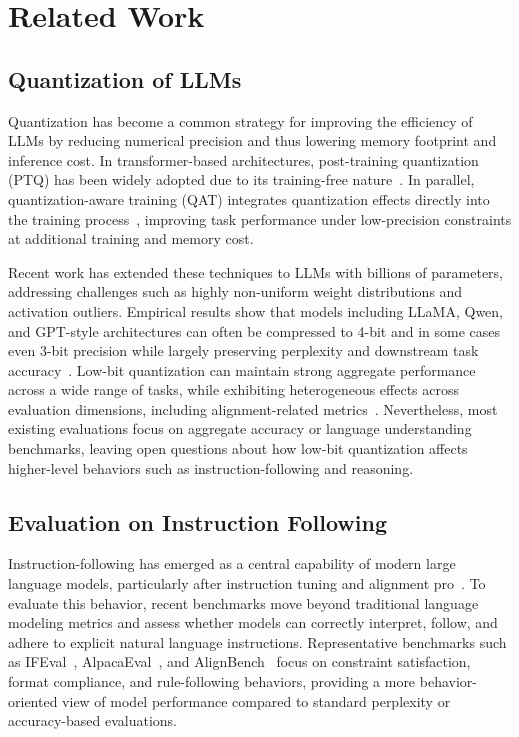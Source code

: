 \section{Related Work}
\label{sec:related}

\subsection{Quantization of LLMs}
Quantization has become a common strategy for improving the efficiency of LLMs by reducing numerical precision and thus lowering memory footprint and inference cost. In transformer-based architectures, post-training quantization (PTQ) has been widely adopted due to its training-free nature~\citep{frantar2022gptq,xiao2023smoothquant, lin2023awq, yao2022zeroquant}. In parallel, quantization-aware training (QAT) integrates quantization effects directly into the training process~\citep{dettmers2023qlora, liu2024llm}, improving task performance under low-precision constraints at additional training and memory cost.


Recent work has extended these techniques to LLMs with billions of parameters, addressing challenges such as highly non-uniform weight distributions and activation outliers. Empirical results show that models including LLaMA, Qwen, and GPT-style architectures can often be compressed to 4-bit and in some cases even 3-bit precision while largely preserving perplexity and downstream task accuracy~\citep{dettmers2022llmint8,frantar2022gptq,lin2023awq}. Low-bit quantization can maintain strong aggregate performance across a wide range of tasks, while exhibiting heterogeneous effects across evaluation dimensions, including alignment-related metrics~\citep{jin2024comprehensive, dettmers2023spqr, kharinaev2025investigating}. Nevertheless, most existing evaluations focus on aggregate accuracy or language understanding benchmarks, leaving open questions about how low-bit quantization affects higher-level behaviors such as instruction-following and reasoning.

\subsection{Evaluation on Instruction Following}
Instruction-following has emerged as a central capability of modern large language models, particularly after instruction tuning and alignment pro~\citep{zhang2025iheval, bang2023multitask}. To evaluate this behavior, recent benchmarks move beyond traditional language modeling metrics and assess whether models can correctly interpret, follow, and adhere to explicit natural language instructions. Representative benchmarks such as IFEval~\citep{zhou2023ifeval}, AlpacaEval~\citep{li2023alpacaeval}, and AlignBench~\citep{liu2024alignbench} focus on constraint satisfaction, format compliance, and rule-following behaviors, providing a more behavior-oriented view of model performance compared to standard perplexity or accuracy-based evaluations.


